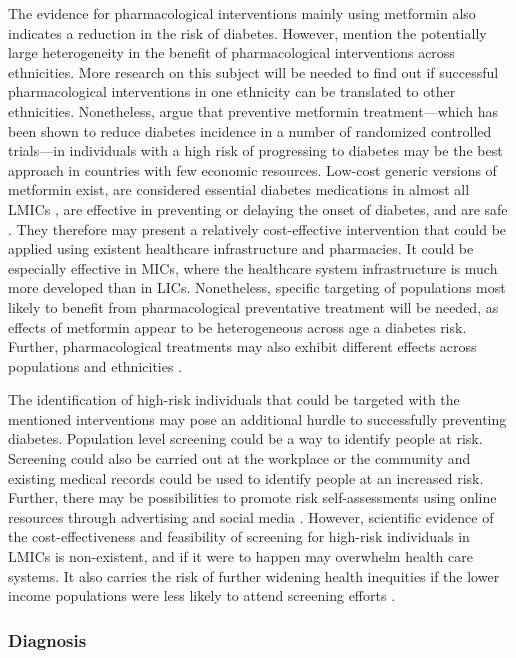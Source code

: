 The evidence for pharmacological interventions mainly using metformin also indicates a reduction in the risk of diabetes. However, \textcite{Cefalu2016} mention the potentially large heterogeneity in the benefit of pharmacological interventions across ethnicities. More research on this subject will be needed to find out if successful pharmacological interventions in one ethnicity can be translated to other ethnicities. Nonetheless, \textcite{Cefalu2016} argue that preventive metformin treatment---which has been shown to reduce diabetes incidence in a number of randomized controlled trials---in individuals with a high risk of progressing to diabetes may be the best approach in countries with few economic resources. Low-cost generic versions of metformin exist, are considered essential diabetes medications in almost all \acp{LMIC} \parencite{Bazargani2014}, are effective in preventing or delaying the onset of diabetes, and are safe \parencite{Gomes2013}. They therefore may present a relatively cost-effective intervention that could be applied using existent healthcare infrastructure and pharmacies. It could be especially effective in \acp{MIC}, where the healthcare system infrastructure is much more developed than in \acp{LIC}. Nonetheless, specific targeting of populations most likely to benefit from pharmacological preventative treatment will be needed, as effects of metformin appear to be heterogeneous across age a diabetes risk. Further, pharmacological treatments may also exhibit different effects across populations and ethnicities \parencite{Cefalu2016}. 

The identification of high-risk individuals that could be targeted with the mentioned interventions may pose an additional hurdle to successfully preventing diabetes. Population level screening could be a way to identify people at risk. Screening could also be carried out at the workplace or the community and existing medical records could be used to identify people at an increased risk. Further, there may be possibilities to promote risk self-assessments using online resources through advertising and social media \parencite{Cefalu2016}. However, scientific evidence of the cost-effectiveness and feasibility of screening for high-risk individuals in \acp{LMIC} is non-existent, and if it were to happen may overwhelm health care systems. It also carries the risk of further widening health inequities if the lower income populations were less likely to attend screening efforts \parencite{Wareham2016}.


\subsubsection{Diagnosis}

